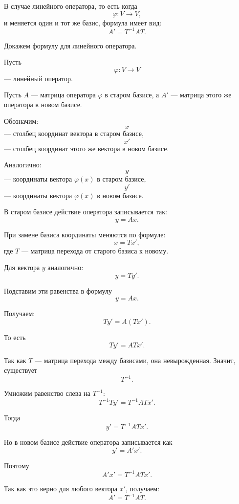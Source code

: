 \begin{remark}
    В случае линейного оператора, то есть когда
    \[
        \varphi: V \to V,
    \]
    и меняется один и тот же базис, формула имеет вид:
    \[
        A' = T^{-1}AT.
    \]
\end{remark}

\begin{Proof}
    Докажем формулу для линейного оператора.
    
    Пусть
    \[
        \varphi: V \to V
    \]
    --- линейный оператор.
    
    Пусть $A$ --- матрица оператора $\varphi$ в старом базисе, а $A'$ --- матрица этого же оператора в новом базисе.
    
    Обозначим:
    \[
        x
    \]
    --- столбец координат вектора в старом базисе,
    \[
        x'
    \]
    --- столбец координат этого же вектора в новом базисе.
    
    Аналогично:
    \[
        y
    \]
    --- координаты вектора $\varphi(x)$ в старом базисе,
    \[
        y'
    \]
    --- координаты вектора $\varphi(x)$ в новом базисе.
    
    В старом базисе действие оператора записывается так:
    \[
        y = Ax.
    \]
    
    При замене базиса координаты меняются по формуле:
    \[
        x = Tx',
    \]
    где $T$ --- матрица перехода от старого базиса к новому.
    
    Для вектора $y$ аналогично:
    \[
        y = Ty'.
    \]
    
    Подставим эти равенства в формулу
    \[
        y = Ax.
    \]
    
    Получаем:
    \[
        Ty' = A(Tx').
    \]
    
    То есть
    \[
        Ty' = ATx'.
    \]
    
    Так как $T$ --- матрица перехода между базисами, она невырожденная. Значит, существует
    \[
        T^{-1}.
    \]
    
    Умножим равенство слева на $T^{-1}$:
    \[
        T^{-1}Ty' = T^{-1}ATx'.
    \]
    
    Тогда
    \[
        y' = T^{-1}ATx'.
    \]
    
    Но в новом базисе действие оператора записывается как
    \[
        y' = A'x'.
    \]
    
    Поэтому
    \[
        A'x' = T^{-1}ATx'.
    \]
    
    Так как это верно для любого вектора $x'$, получаем:
    \[
        A' = T^{-1}AT.
    \]
\end{Proof}
